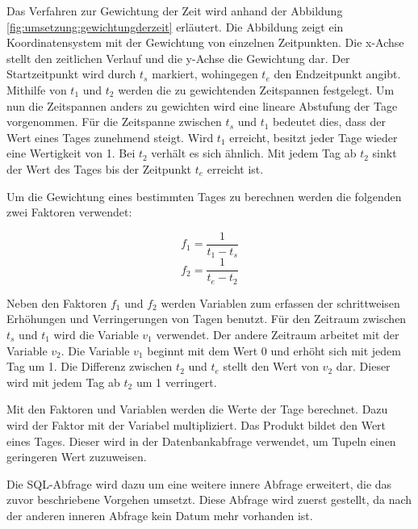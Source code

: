 Das Verfahren zur Gewichtung der Zeit wird anhand der Abbildung \ref{fig:umsetzung:gewichtungderzeit} erläutert. Die Abbildung zeigt ein Koordinatensystem mit der Gewichtung von einzelnen Zeitpunkten. Die x-Achse stellt den zeitlichen Verlauf und die y-Achse die Gewichtung dar. Der Startzeitpunkt wird durch $t_{s}$ markiert, wohingegen $t_{e}$ den Endzeitpunkt angibt. Mithilfe von $t_1$ und $t_2$ werden die zu gewichtenden Zeitspannen festgelegt. Um nun die Zeitspannen anders zu gewichten wird eine lineare Abstufung der Tage vorgenommen. Für die Zeitspanne zwischen $t_{s}$ und $t_1$ bedeutet dies, dass der Wert eines Tages zunehmend steigt. Wird $t_1$ erreicht, besitzt jeder Tage wieder eine Wertigkeit von 1. Bei $t_2$ verhält es sich ähnlich. Mit jedem Tag ab $t_2$ sinkt der Wert des Tages bis der Zeitpunkt $t_{e}$ erreicht ist.

Um die Gewichtung eines bestimmten Tages zu berechnen werden die folgenden zwei Faktoren verwendet:

\begin{equation}
f_1 = \frac{1}{t_1 - t_{s}}
\end{equation}
\begin{equation}
f_2 = \frac{1}{t_{e} - t_2}
\end{equation}

Neben den Faktoren $f_1$ und $f_2$ werden Variablen zum erfassen der schrittweisen Erhöhungen und Verringerungen von Tagen benutzt. Für den Zeitraum zwischen   
$t_{s}$ und $t_{1}$ wird die Variable $v_{1}$ verwendet. Der andere Zeitraum arbeitet mit der Variable $v_{2}$. Die Variable $v_{1}$ beginnt mit dem Wert 0 und erhöht sich mit jedem Tag um 1. Die Differenz zwischen $t_{2}$ und $t_{e}$ stellt den Wert von $v_{2}$ dar. Dieser wird mit jedem Tag ab $t_{2}$ um 1 verringert.

Mit den Faktoren und Variablen werden die Werte der Tage berechnet. Dazu wird der Faktor mit der Variabel multipliziert. Das Produkt bildet den Wert eines Tages. Dieser wird in der Datenbankabfrage verwendet, um Tupeln einen geringeren Wert zuzuweisen. 

Die SQL-Abfrage wird dazu um eine weitere innere Abfrage erweitert, die das zuvor beschriebene Vorgehen umsetzt. Diese Abfrage wird zuerst gestellt, da nach der anderen inneren Abfrage kein Datum mehr vorhanden ist. 

